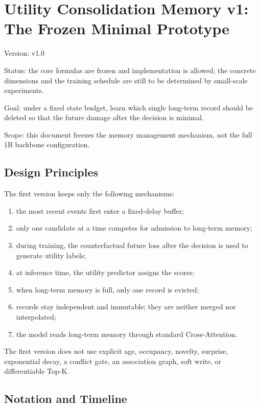 \section{Utility Consolidation Memory v1: The Frozen Minimal Prototype}

\begin{notesquote}
Version: v1.0

Status: the core formulas are frozen and implementation is allowed; the concrete dimensions and the training schedule are still to be determined by small-scale experiments.

Goal: under a fixed state budget, learn which single long-term record should be deleted so that the future damage after the decision is minimal.

Scope: this document freezes the memory management mechanism, not the full 1B backbone configuration.
\end{notesquote}

\subsection{Design Principles}

The first version keeps only the following mechanisms:

\begin{enumerate}
  \item the most recent events first enter a fixed-delay buffer;
  \item only one candidate at a time competes for admission to long-term memory;
  \item during training, the counterfactual future loss after the decision is used to generate utility labels;
  \item at inference time, the utility predictor assigns the scores;
  \item when long-term memory is full, only one record is evicted;
  \item records stay independent and immutable; they are neither merged nor interpolated;
  \item the model reads long-term memory through standard Cross-Attention.
\end{enumerate}

The first version does not use explicit age, occupancy, novelty, surprise, exponential decay, a conflict gate, an association graph, soft write, or differentiable Top-K.

\subsection{Notation and Timeline}

